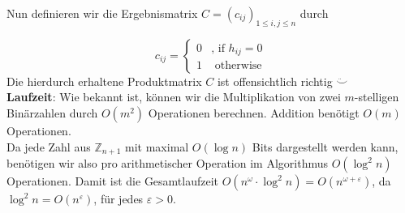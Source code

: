 \documentclass[11pt,a4paper,ngerman]{article}
\begin{document}
Nun definieren wir die Ergebnismatrix $C = \left(c_{ij} \right)_{1 \leq i,j \leq n}$ durch

\begin{equation*}
c_{ij} = \begin{cases}
          0 & \text{, if $h_{ij} = 0$} \\
          1 & \text{ otherwise}
       \end{cases}
\end{equation*}
Die hierdurch erhaltene Produktmatrix  $C$ ist offensichtlich richtig $\ddot\smile$\\

\textbf{Laufzeit}: Wie bekannt ist, können wir die Multiplikation von zwei $m$-stelligen Binärzahlen
durch $O(m^2)$ Operationen berechnen. Addition benötigt $O(m)$ Operationen. \\
Da jede Zahl aus $\mathbb{Z}_{n+1}$ mit maximal $O(\log n)$ Bits dargestellt werden kann, benötigen
wir also pro arithmetischer Operation im Algorithmus $O(\log^2 n)$ Operationen.
Damit ist die Gesamtlaufzeit $O(n^{\omega} \cdot \log^2 n) = O(n^{\omega + \varepsilon})$, da
$\log^2 n = O(n^\varepsilon)$, für jedes $\varepsilon > 0$.
\label{LastPage}
\end{document}
